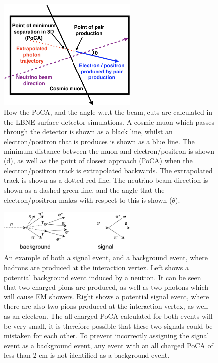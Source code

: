\begin{figure}[h!]
  \centering
  \includegraphics[width=0.6\textwidth]{PoCA_Beam_Cuts}
  \caption[How the PoCA, and the angle w.r.t the beam, cuts are calculated in the LBNE surface detector simulations]
          {How the PoCA, and the angle w.r.t the beam, cuts are calculated in the LBNE surface detector simulations. A cosmic muon which passes through the detector is shown as a black line, whilst an electron/positron that is produces is shown as a blue line. The minimum distance between the muon and electron/positron is shown (d), as well as the point of closest approach (PoCA) when the electron/positron track is extrapolated backwards. The extrapolated track is shown as a dotted red line. The neutrino beam direction is shown as a dashed green line, and the angle that the electron/positron makes with respect to this is shown ($\theta$).}
  \label{fig:SurfPoCACut}
\end{figure}

\begin{figure}[h!]
  \centering
  \includegraphics[width=0.6\textwidth]{signal_PoCA}
  \caption[An example of both a signal event, and a background event, where hadrons are produced at the interaction vertex]
          {An example of both a signal event, and a background event, where hadrons are produced at the interaction vertex. Left shows a potential background event induced by a neutron. It can be seen that two charged pions are produced, as well as two photons which will cause EM showers. Right shows a potential signal event, where there are also two pions produced at the interaction vertex, as well as an electron. The all charged PoCA calculated for both events will be very small, it is therefore possible that these two signals could be mistaken for each other. To prevent incorrectly assigning the signal event as a background event, any event with an all charged PoCA of less than 2 cm is not identified as a background event.}
  \label{fig:SurfSigBack}
\end{figure}

